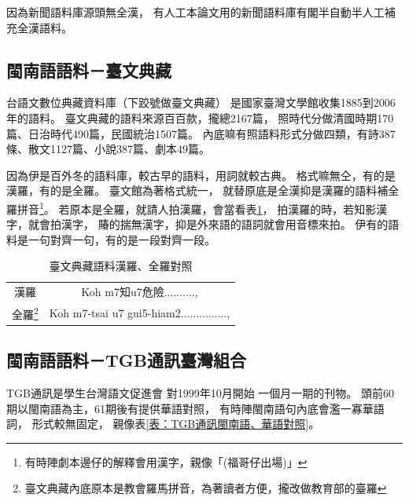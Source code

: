 因為新聞語料庫源頭無全漢，
有人工本論文用的新聞語料庫有閣半自動半人工補充全漢語料。


\subsection{閩南語語料－臺文典藏}
\label{節：臺文典藏}
台語文數位典藏資料庫（下跤號做臺文典藏）\cite{台語文數位典藏資料庫}
是國家臺灣文學館收集1885到2006年的語料。
臺文典藏的語料來源百百款，攏總2167篇，
照時代分做清國時期170篇、日治時代490篇，民國統治1507篇。
內底嘛有照語料形式分做四類，有詩387條、散文1127篇、小說387篇、劇本49篇。%

因為伊是百外冬的語料庫，較古早的語料，用詞就較古典。
格式嘛無仝，有的是漢羅，有的是全羅。
臺文館為著格式統一，
就替原底是全漢抑是漢羅的語料補全羅拼音\footnote{有時陣劇本邊仔的解釋會用漢字，親像「(福哥仔出場)」}。
若原本是全羅，就請人拍漢羅，會當看表\ref{表：臺文典藏語料}，
拍漢羅的時，若知影漢字，就會拍漢字，
賰的揣無漢字，抑是外來語的語詞就會用音標來拍。
伊有的語料是一句對齊一句，有的是一段對齊一段。

\begin{table}
\caption{臺文典藏語料漢羅、全羅對照}
\label{表：臺文典藏語料}
\centering
\begin{tabular}{c|c}
漢羅 & Koh m7知u7危險.........., \\
全羅\footnote{臺文典藏內底原本是教會羅馬拼音，為著讀者方便，攏改做教育部的臺羅} & Koh m7-tsai u7 gui5-hiam2...............,\\
\end{tabular}
\end{table}


\subsection{閩南語語料－TGB通訊臺灣組合}
\label{節：TGB通訊－臺灣組合}
TGB通訊\cite{TGB通訊}是學生台灣語文促進會
對1999年10月開始\cite{學生台灣語文促進會對1999年10月開始}
一個月一期的刊物。
頭前60期以閩南語為主，61期後有提供華語對照，
有時陣閩南語句內底會濫一寡華語詞，
形式較無固定，
親像表\ref{表：TGB通訊閩南語、華語對照}。


